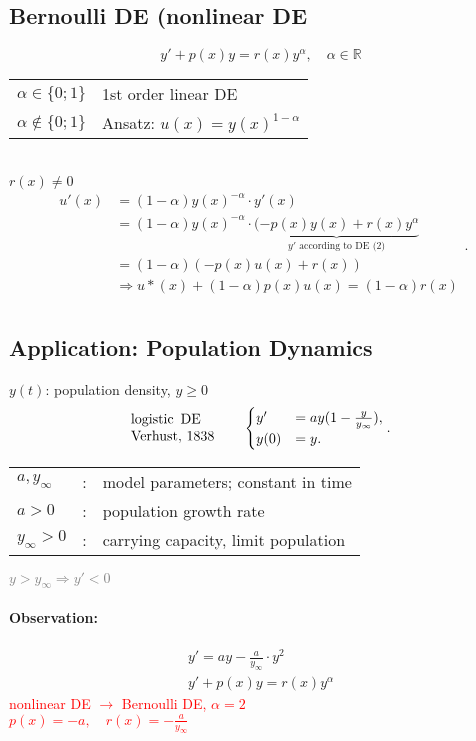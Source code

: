 \documentclass[]{article}
\begin{document}
\subsection{Bernoulli DE (nonlinear DE}
\begin{equation}
y'+p(x)y=r(x)y ^{\alpha},\quad \alpha \in \mathbb R
\end{equation}
\begin{tabular}{@{}l l}
	$\alpha\in \{0;1\}$ & 1st order linear DE\\
$\alpha\not\in \{0;1\}$ & Ansatz: $u(x)=y(x) ^{1-\alpha}$
\end{tabular}\\
$r(x)\not=0$
\[
\begin{split}
	u'(x) & = (1-\alpha) y(x) ^{-\alpha} \cdot y'(x)\\
	      &=(1-\alpha) y(x) ^{-\alpha} \cdot \underbrace{(-p(x)y(x)+r(x)y ^{\alpha}}_\text{$y'$ according to DE (2)}\\
	      &= (1-\alpha) (-p(x)u(x)+r(x))\\
	      &\Rightarrow u*(x)  +(1-\alpha)p(x)u(x)=(1-\alpha)r(x)\\
\end{split}
.\]
\subsection{Application: Population Dynamics}
$y(t)$: population density,  $y\ge 0$
\[
	\parbox{8em}{logistic DE$~~~~~~$ Verhust, 1838}
	\begin{cases} 
		y' &= ay(1- \frac{y}{y_\infty}), \\
	 y(0)&= y.
	\end{cases}
.\]
\begin{tabular}{@{}l l l}
	$a,y_\infty$ & : & model parameters; constant in time\\
	$a >0$ & : & population growth rate\\
	$y_\infty >0$ & : & carrying capacity, limit population\\
\end{tabular}
\textcolor{gray}{$ y > y_\infty \Rightarrow y' < 0$}
\paragraph{Observation:} \[
	\begin{split}
		y'=ay- \frac{a}{y_\infty} \cdot y ^{2}\\ 
		y'+p(x)y=r(x)y ^{\alpha}
	\end{split}
\]
	\textcolor{red}{nonlinear DE $\rightarrow$ Bernoulli DE, $\alpha = 2$}\\
	\textcolor{red}{$p(x)=-a,\quad r(x)=- \frac{a}{y_\infty}$}
\end{document}
